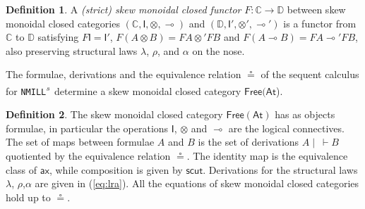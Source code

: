 \documentclass[copyright,creativecommons]{eptcs}
\theoremstyle{definition}
\newtheorem{defn}{Definition}[section]
\newcommand{\ax}{\mathsf{ax}}
\newcommand{\ot}{\otimes}
\newcommand{\lolli}{\multimap}
\newcommand{\I}{\mathsf{I}}
\newcommand{\NMILL}{\texttt{NMILL}}
\newcommand{\SkNMILL}{\NMILL\textsuperscript{\textit{s}}}
\newcommand{\FSkMCC}{\mathsf{Free}}
\begin{document}
\begin{defn}
  A \emph{(strict) skew monoidal closed functor} $F : \mathbb{C} \rightarrow \mathbb{D}$ between skew monoidal closed categories $(\mathbb{C} , \I , \ot , \lolli)$ and $(\mathbb{D} , \I' , \ot' , \lolli')$ is a functor from $\mathbb{C}$ to $\mathbb{D}$ satisfying
    $F \I = \I'$, $F (A \ot B) = F A \ot' F B$ and
    $F(A \lolli B) = F A \lolli' F B$, also preserving  structural laws $\lambda$, $\rho$, and $\alpha$ on the nose.
\end{defn}

The formulae, derivations and the equivalence relation $\circeq$ of the sequent calculus for \SkNMILL\ determine a skew monoidal closed category $\FSkMCC(\mathsf{At}$).
\begin{defn}\label{def:fskmcc}
  The skew monoidal closed category $\FSkMCC(\mathsf{At})$ has
  as objects formulae, in particular the operations $\I$, $\ot$ and $\lolli$ are the logical connectives. The set of maps between formulae $A$ and $B$ is the set of derivations $A \mid ~ \vdash B$ quotiented by the equivalence relation $\circeq$. The identity map is the equivalence class of $\ax$, while composition is given by $\mathsf{scut}$. Derivations for the structural laws $\lambda$, $\rho$,$\alpha$ are given in (\ref{eq:lra}). All the equations of skew monoidal closed categories hold up to $\circeq$.
\end{defn}
\end{document}
